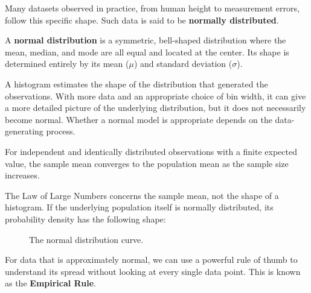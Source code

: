 Many datasets observed in practice, from human height to measurement errors, follow this specific shape. Such data is said to be \textbf{normally distributed}.

\begin{definition}
A \textbf{normal distribution} is a symmetric, bell-shaped distribution where the mean, median, and mode are all equal and located at the center. Its shape is determined entirely by its mean ($\mu$) and standard deviation ($\sigma$).
\end{definition}

A histogram estimates the shape of the distribution that generated the observations. With more data and an appropriate choice of bin width, it can give a more detailed picture of the underlying distribution, but it does not necessarily become normal. Whether a normal model is appropriate depends on the data-generating process.

\begin{theorem}
    For independent and identically distributed observations with a finite expected value, the sample mean converges to the population mean as the sample size increases.
\end{theorem}

The Law of Large Numbers concerns the sample mean, not the shape of a histogram. If the underlying population itself is normally distributed, its probability density has the following shape:

\begin{figure}[htbp]
    \centering
    \caption{The normal distribution curve.}
    \label{fig:normal_curve_smooth}
\end{figure}

For data that is approximately normal, we can use a powerful rule of thumb to understand its spread without looking at every single data point. This is known as the \textbf{Empirical Rule}.


